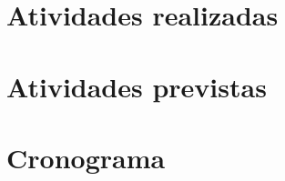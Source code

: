 \documentclass[
	12pt,				%
	oneside,			%
	a4paper,			%
	english,			%
	french,				%
	spanish,			%
	brazil				%
	]{abntex2}
\begin{document}
\hypertarget{atividades-realizadas}{%
\section{Atividades realizadas}\label{atividades-realizadas}}

\hypertarget{atividades-previstas}{%
\section{Atividades previstas}\label{atividades-previstas}}

\hypertarget{cronograma}{%
\section{Cronograma}\label{cronograma}}

\postextual

\postextual



\end{document}

